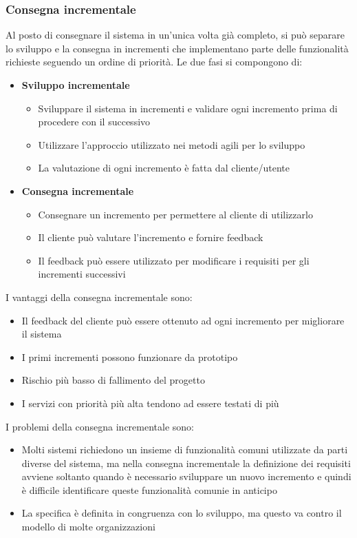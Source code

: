 \documentclass[a4paper]{article}
\begin{document}
\subsubsection{Consegna incrementale}
Al posto di consegnare il sistema in un'unica volta già completo, si può separare lo
sviluppo e la consegna in incrementi che implementano parte delle funzionalità richieste
seguendo un ordine di priorità.
Le due fasi si compongono di:
\begin{itemize}
  \item \textbf{Sviluppo incrementale}
    \begin{itemize}
      \item Sviluppare il sistema in incrementi e validare ogni incremento prima di 
        procedere con il successivo
      \item Utilizzare l'approccio utilizzato nei metodi agili per lo sviluppo
      \item La valutazione di ogni incremento è fatta dal cliente/utente
    \end{itemize}

  \item \textbf{Consegna incrementale}
    \begin{itemize}
      \item Consegnare un incremento per permettere al cliente di utilizzarlo
      \item Il cliente può valutare l'incremento e fornire feedback
      \item Il feedback può essere utilizzato per modificare i requisiti per gli incrementi
        successivi
    \end{itemize}
\end{itemize}
I vantaggi della consegna incrementale sono:
\begin{itemize}
  \item Il feedback del cliente può essere ottenuto ad ogni incremento per migliorare
    il sistema
  \item I primi incrementi possono funzionare da prototipo
  \item Rischio più basso di fallimento del progetto
  \item I servizi con priorità più alta tendono ad essere testati di più
\end{itemize}
I problemi della consegna incrementale sono:
\begin{itemize}
  \item Molti sistemi richiedono un insieme di funzionalità comuni utilizzate da parti
    diverse del sistema, ma nella consegna incrementale la definizione dei requisiti
    avviene soltanto quando è necessario sviluppare un nuovo incremento e quindi è
    difficile identificare queste funzionalità comunie in anticipo
  \item La specifica è definita in congruenza con lo sviluppo, ma questo va contro
    il modello di molte organizzazioni
\end{itemize}
\end{document}
